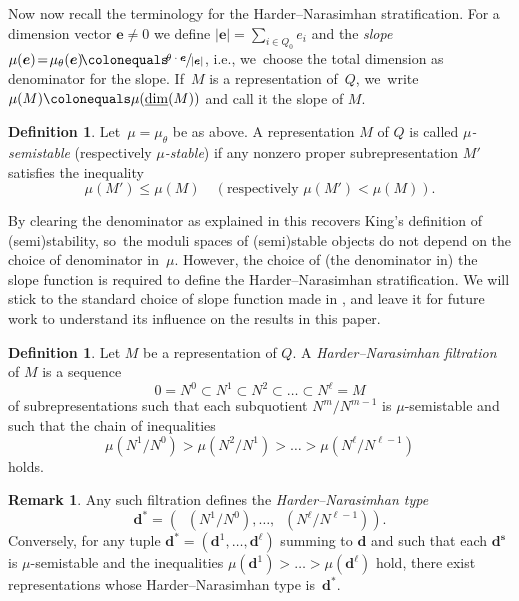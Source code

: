 \documentclass[11pt]{article}
\theoremstyle{plain}
\theoremstyle{definition}
\newtheorem{definition}[theorem]{Definition}
\newtheorem{remark}[theorem]{Remark}
\DeclareMathOperator\dimvect{\underline{\operatorname{dim}}}
\newcommand\tuple[1]{\ensuremath{{\boldsymbol{#1}}}}
\begin{document}
Now now recall the terminology for the Harder--Narasimhan stratification.
For a dimension vector $\tuple{e} \!\neq\! 0$ we define $|\tuple{e}| \!=\! \sum_{i \in Q_0} e_i$
and the \emph{slope}~\hbox{$\mu(\tuple{e}) \!=\! \mu_\theta(\tuple{e}) \!\colonequals\! \sfrac{\theta\cdot\tuple{e}}{|\tuple{e}|}$},
i.e., we~choose the total dimension as denominator for the slope.
If~$M$ is a representation of~$Q$, we~write~$\mu(M)\colonequals\mu(\dimvect(M))$ and call it the slope of $M$.

\begin{definition}
Let~$\mu=\mu_\theta$ be as above.
A representation $M$ of $Q$ is called \emph{$\mu$\nobreakdash-semistable} (respectively \emph{$\mu$\nobreakdash-stable})
if any nonzero proper subrepresentation $M'$ satisfies the inequality
\begin{equation*}
\mu(M') \leq \mu(M) \quad(\text{respectively } \mu(M') < \mu(M)).
\end{equation*}
\end{definition}

By clearing the denominator as explained in \cite[Rem.\,2.3]{MR3199484}
this recovers King's definition of (semi)stability, so~the moduli spaces of (semi)stable objects do not depend on the choice of denominator in~$\mu$.
However, the choice of (the denominator in) the slope function
is required to define the Harder--Narasimhan stratification.
We will stick to the standard choice of slope function made in \cite{MR1974891},
and leave it for future work to understand its influence on the results in this paper.

\begin{definition}
Let $M$ be a representation of $Q$.
A \emph{Harder--Narasimhan filtration} of $M$ is a sequence
\begin{equation*}
0 = N^0 \subset N^1 \subset N^2 \subset \ldots \subset N^\ell = M
\end{equation*}
of subrepresentations such that each subquotient $N^m/N^{m-1}$ is $\mu$\nobreakdash-semistable
and such that the chain of inequalities
\begin{equation*}
\mu(N^1/N^0) > \mu(N^2/N^1) > \ldots > \mu(N^\ell/N^{\ell-1})
\end{equation*}
holds.
\end{definition}

\begin{remark}
Any such filtration defines the \emph{Harder--Narasimhan type}
\begin{equation*}
\tuple{d}^* = (\dimvect(N^1/N^0),\ldots,\dimvect(N^{\ell}/N^{\ell-1})).
\end{equation*}
Conversely, for any tuple
$\tuple{d}^* = (\tuple{d}^1,\ldots,\tuple{d}^{\ell})$ summing to $\tuple{d}$ and
such that each $\tuple{d^s}$ is $\mu$\nobreakdash-semistable and
the inequalities $\mu(\tuple{d}^1)>\ldots>\mu(\tuple{d}^{\ell})$ hold,
there exist representations whose Harder--Narasimhan type is~$\tuple{d}^*$.
\end{remark}
\end{document}
